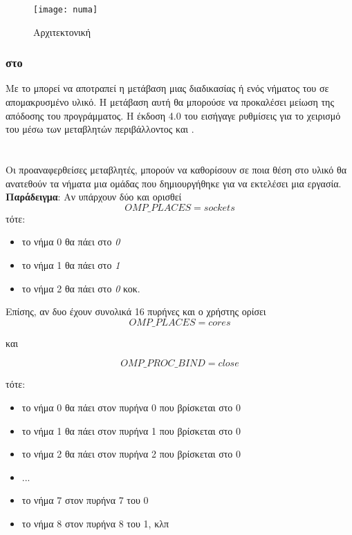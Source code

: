 \clearpage

\begin{figure}[h]
\texttt{[image: numa]}
\centering
\captionsetup{justification=centering, singlelinecheck=false}
	\caption{Αρχιτεκτονική \cite{thenextstep152}}
\label{fig:numa}
\end{figure}

\subsubsection{\emph{} στο \emph{}}
\mbox{}
Με το \emph{} μπορεί να αποτραπεί η μετάβαση μιας διαδικασίας \emph{} ή ενός νήματος του
\emph{} σε απομακρυσμένο υλικό. Η μετάβαση αυτή θα μπορούσε να προκαλέσει μείωση της απόδοσης του
προγράμματος. Η έκδοση 4.0 του \emph{} εισήγαγε ρυθμίσεις για το χειρισμό του \emph{} μέσω των
μεταβλητών περιβάλλοντος  \emph{} και \emph{}\cite{affinity1}. \ \\
\clearpage
\paragraph{\emph{}}
\ \\
Οι προαναφερθείσες μεταβλητές, μπορούν να καθορίσουν σε ποια θέση στο υλικό θα ανατεθούν τα νήματα μια ομάδας που
δημιουργήθηκε για να εκτελέσει μια εργασία. \ \\
\textbf{Παράδειγμα}: Αν υπάρχουν δύο \emph{} και ορισθεί $$OMP\_PLACES=sockets$$ τότε:
\begin{itemize}
\item{το νήμα 0 θα πάει στο \emph{ 0}}
\item{το νήμα 1 θα πάει στο \emph{ 1}}
\item{το νήμα 2 θα πάει στο \emph{ 0}} κοκ.
\end{itemize}

Επίσης, αν δυο \emph{} έχουν συνολικά 16 πυρήνες και ο χρήστης ορίσει $$OMP\_PLACES=cores$$
\begin{center}και\end{center} $$OMP\_PROC\_BIND=close$$ 

τότε:
\begin{itemize}
\item{το νήμα 0	θα πάει στον πυρήνα 0 που βρίσκεται στο \emph{} 0}
\item{το νήμα 1	θα πάει στον πυρήνα 1 που βρίσκεται στο \emph{} 0}
\item{το νήμα 2	θα πάει στον πυρήνα 2 που βρίσκεται στο \emph{} 0}
\item{...}
\item{το νήμα 7 στον πυρήνα 7 του \emph{} 0}
\item{το νήμα 8 στον πυρήνα 8 του \emph{} 1, κλπ}
\end{itemize}

